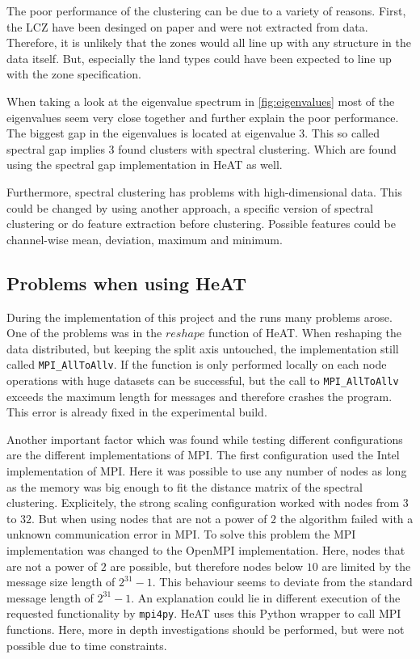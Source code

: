 The poor performance of the clustering can be due to a variety of reasons.
First, the \gls{LCZ} have been desinged on paper and were not extracted from data. Therefore, it is unlikely that
the zones would all line up with any structure in the data itself.
But, especially the land types could have been expected to line up with the zone specification.

When taking a look at the eigenvalue spectrum in \cref{fig:eigenvalues} most of the eigenvalues seem very close together and
further explain the poor performance. The biggest gap in the eigenvalues is located at eigenvalue 3. This so called spectral gap
implies 3 found clusters with spectral clustering. Which are found using the spectral gap implementation in \gls{HeAT} as well.

Furthermore, spectral clustering has problems with high-dimensional data. This could be changed by using another approach, a specific version of spectral clustering
or do feature extraction before clustering. Possible features could be channel-wise mean, deviation, maximum and minimum.

\subsection{Problems when using HeAT}
\label{subsec:problems_when_using_heat}
During the implementation of this project and the runs many problems arose.
One of the problems was in the \(reshape\) function of \gls{HeAT}.
When reshaping the data distributed, but keeping the split axis untouched, the implementation still called \lstinline{MPI_AllToAllv}.
If the function is only performed locally on each node operations with huge datasets can be successful, but the call to \lstinline{MPI_AllToAllv} exceeds the maximum length
for messages and therefore crashes the program.
This error is already fixed in the experimental build.

Another important factor which was found while testing different configurations are the different implementations of \gls{MPI}.
The first configuration used the Intel implementation of \gls{MPI}. Here it was possible to use any number of nodes as long as
the memory was big enough to fit the distance matrix of the spectral clustering. Explicitely, the strong scaling configuration worked
with nodes from \(3\) to \(32\).
But when using nodes that are not a power of \(2\) the algorithm failed with a unknown communication error in \gls{MPI}.
To solve this problem the \gls{MPI} implementation was changed to the OpenMPI implementation.
Here, nodes that are not a power of \(2\) are possible, but therefore nodes below \(10\) are limited by the message size length of \(2^{31} - 1\).
This behaviour seems to deviate from the standard message length of \(2^{31} - 1\).
An explanation could lie in different execution of the requested functionality by \lstinline{mpi4py}.
\gls{HeAT} uses this Python wrapper to call \gls{MPI} functions.
Here, more in depth investigations should be performed, but were not possible due to time constraints.
